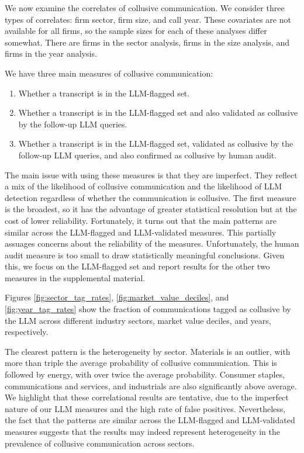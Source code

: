 We now examine the correlates of collusive communication. We consider three types of correlates: firm sector, firm size, and call year. These covariates are not available for all firms, so the sample sizes for each of these analyses differ somewhat. There are  firms in the sector analysis,  firms in the size analysis, and  firms in the year analysis.

We have three main measures of collusive communication:
\begin{enumerate}
    \item Whether a transcript is in the LLM-flagged set.
    \item Whether a transcript is in the LLM-flagged set and also validated as collusive by the follow-up LLM queries.
    \item Whether a transcript is in the LLM-flagged set, validated as collusive by the follow-up LLM queries, and also confirmed as collusive by human audit.
\end{enumerate}

The main issue with using these measures is that they are imperfect. They reflect a mix of the likelihood of collusive communication and the likelihood of LLM detection regardless of whether the communication is collusive. The first measure is the broadest, so it has the advantage of greater statistical resolution but at the cost of lower reliability. Fortunately, it turns out that the main patterns are similar across the LLM-flagged and LLM-validated measures. This partially assuages concerns about the reliability of the measures. Unfortunately, the human audit measure is too small to draw statistically meaningful conclusions. Given this, we focus on the LLM-flagged set and report results for the other two measures in the supplemental material.

Figures \ref{fig:sector_tag_rates}, \ref{fig:market_value_deciles}, and \ref{fig:year_tag_rates} show the fraction of communications tagged as collusive by the LLM across different industry sectors, market value deciles, and years, respectively.

The clearest pattern is the heterogeneity by sector. Materials is an outlier, with more than triple the average probability of collusive communication. This is followed by energy, with over twice the average probability. Consumer staples, communications and services, and industrials are also significantly above average. We highlight that these correlational results are tentative, due to the imperfect nature of our LLM measures and the high rate of false positives. Nevertheless, the fact that the patterns are similar across the LLM-flagged and LLM-validated measures suggests that the results may indeed represent heterogeneity in the prevalence of collusive communication across sectors.

